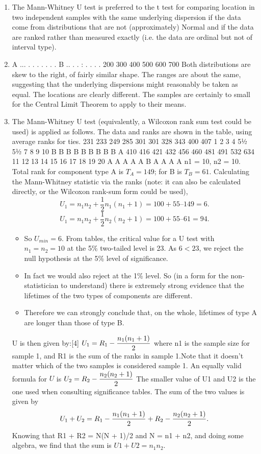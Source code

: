 \documentclass[a4paper,12pt]{article}
\begin{document}
\begin{enumerate}
\item The Mann-Whitney U test is preferred to the t test for comparing location in two independent samples with the same underlying dispersion if the data come from distributions that are not (approximately) Normal and if the data are ranked rather than measured exactly (i.e. the data are ordinal but not of interval type).
\item
A
... . . . . .
.
.
B
.. . .
: . .
. .
200 300 400 500 600 700
Both distributions are skew to the right, of fairly similar shape. The ranges are about the same, suggesting that the underlying dispersions might reasonably be taken as equal. The locations are clearly different. The samples are certainly to small for the Central Limit Theorem to apply to their means.
\item The Mann-Whitney U test (equivalently, a Wilcoxon rank sum test could be used) is applied as follows. The data and ranks are shown in the table, using average ranks for ties.
231
233
249
285
301
301
328
343
400
407
1
2
3
4
5½
5½
7
8
9
10
B
B
B
B
B
B
B
B
B
A
410
416
421
432
456
460
481
491
532
634
11
12
13
14
15
16
17
18
19
20
A
A
A
A
A
B
A
A
A
A
n1 = 10, n2 = 10. Total rank for component type A is $T_A = 149$; for B is $T_B = 61$.
Calculating the Mann-Whitney statistic via the ranks (note: it can also be calculated directly, or the Wilcoxon rank-sum form could be used),
\[U_1 = n_1n_2 + \frac{1}{2}n_1(n_1+1) = 100 + 55 – 149 = 6.\]
\[U_1 = n_1n_2 + \frac{1}{2}n_2(n_2+1)= 100 + 55 – 61 = 94.\]
\begin{itemize}
\item So $U_{min} = 6$. From tables, the critical value for a U test with $n_1 = n_2 = 10$ at the 5\% two-tailed level is 23. As $6 < 23$, we reject the null hypothesis at the 5\% level of significance.
\item In fact we would also reject at the 1\% level. So (in a form for the non-statistician to understand) there is extremely strong evidence that the lifetimes of the two types of components are different. 
\item Therefore we can strongly conclude that, on the whole, lifetimes of type A are longer than those of type B.
\end{itemize}

\begin{framed}

U is then given by:[4]
$ {\displaystyle U_{1}=R_{1}-{n_{1}(n_{1}+1) \over 2}\,\!}  $ 
where n1 is the sample size for sample 1, and R1 is the sum of the ranks in sample 1.Note that it doesn't matter which of the two samples is considered sample 1. An equally valid formula for $U$ is
${\displaystyle U_{2}=R_{2}-{n_{2}(n_{2}+1) \over 2}\,\!} $
The smaller value of U1 and U2 is the one used when consulting significance tables. The sum of the two values is given by \[ {\displaystyle U_{1}+U_{2}=R_{1}-{n_{1}(n_{1}+1) \over 2}+R_{2}-{n_{2}(n_{2}+1) \over 2}.\,\!}\] 
Knowing that R1 + R2 = N(N + 1)/2 and N = n1 + n2, and doing some algebra, we find that the sum is $U1 + U2 = n_1n_2$.
\end{framed}
\end{enumerate}
\end{document}
